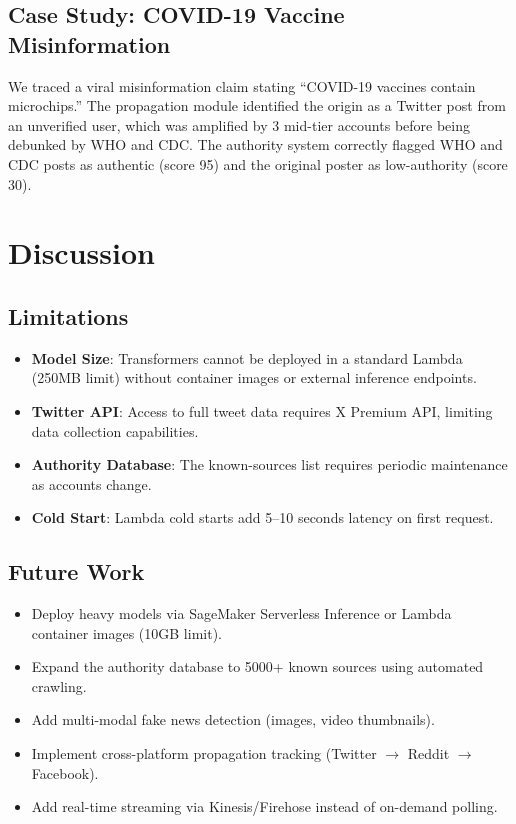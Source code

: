 \documentclass[12pt,a4paper]{article}
\begin{document}
\subsection{Case Study: COVID-19 Vaccine Misinformation}
We traced a viral misinformation claim stating ``COVID-19 vaccines contain microchips.'' The propagation module identified the origin as a Twitter post from an unverified user, which was amplified by 3 mid-tier accounts before being debunked by WHO and CDC. The authority system correctly flagged WHO and CDC posts as authentic (score 95) and the original poster as low-authority (score 30).

\section{Discussion}

\subsection{Limitations}
\begin{itemize}
    \item \textbf{Model Size}: Transformers cannot be deployed in a standard Lambda (250MB limit) without container images or external inference endpoints.
    \item \textbf{Twitter API}: Access to full tweet data requires X Premium API, limiting data collection capabilities.
    \item \textbf{Authority Database}: The known-sources list requires periodic maintenance as accounts change.
    \item \textbf{Cold Start}: Lambda cold starts add 5--10 seconds latency on first request.
\end{itemize}

\subsection{Future Work}
\begin{itemize}
    \item Deploy heavy models via SageMaker Serverless Inference or Lambda container images (10GB limit).
    \item Expand the authority database to 5000+ known sources using automated crawling.
    \item Add multi-modal fake news detection (images, video thumbnails).
    \item Implement cross-platform propagation tracking (Twitter $\rightarrow$ Reddit $\rightarrow$ Facebook).
    \item Add real-time streaming via Kinesis/Firehose instead of on-demand polling.
\end{itemize}
\end{document}
